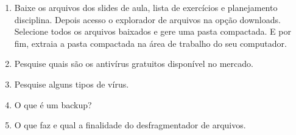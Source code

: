 \documentclass[11pt]{article}
\begin{document}
\begin{enumerate}
		\item Baixe os arquivos dos slides de aula, lista de exercícios e planejamento disciplina. Depois acesso o explorador de arquivos na opção downloads. Selecione todos os arquivos baixados e gere uma pasta compactada. E por fim, extraia a pasta compactada na área de trabalho do seu computador.
		\item Pesquise quais são os antivírus gratuitos disponível no mercado.
		\item Pesquise alguns tipos de vírus.
		\item O que é um backup?
		\item O que faz e qual a finalidade do desfragmentador de arquivos. 
	\end{enumerate}
\end{document}
